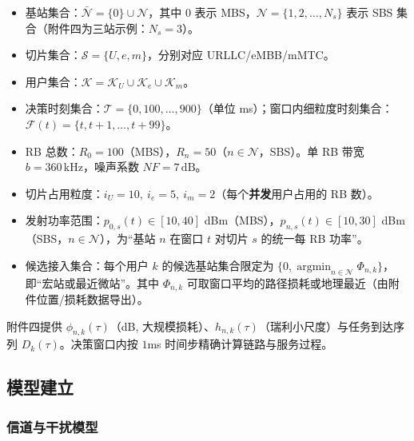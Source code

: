 \begin{itemize}
  \item 基站集合：$\bar{\mathcal{N}}=\{0\}\cup\mathcal{N}$，其中 $0$ 表示 MBS，$\mathcal{N}=\{1,2,\dots,N_s\}$ 表示 SBS 集合（附件四为三站示例：$N_s=3$）。
  \item 切片集合：$\mathcal{S}=\{U,e,m\}$，分别对应 URLLC/eMBB/mMTC。
  \item 用户集合：$\mathcal{K}=\mathcal{K}_U\cup\mathcal{K}_e\cup\mathcal{K}_m$。
  \item 决策时刻集合：$\mathcal{T}=\{0,100,\dots,900\}$（单位 ms）；窗口内细粒度时刻集合：$\mathcal{F}(t)=\{t,t+1,\dots,t+99\}$。
  \item RB 总数：$R_0=100$（MBS），$R_n=50$（$n\in\mathcal{N}$，SBS）。单 RB 带宽 $b=360\,\mathrm{kHz}$，噪声系数 $NF=7\,\mathrm{dB}$。
  \item 切片占用粒度：$i_U=10,\ i_e=5,\ i_m=2$（每个\textbf{并发}用户占用的 RB 数）。
  \item 发射功率范围：$p_{0,s}(t)\in[10,40]$ dBm（MBS），$p_{n,s}(t)\in[10,30]$ dBm（SBS，$n\in\mathcal{N}$），为“基站 $n$ 在窗口 $t$ 对切片 $s$ 的统一每 RB 功率”。
  \item 候选接入集合：每个用户 $k$ 的候选基站集合限定为 $\{0,\operatorname*{argmin}_{n\in\mathcal{N}}\Phi_{n,k}\}$，即“宏站或最近微站”。其中 $\Phi_{n,k}$ 可取窗口平均的路径损耗或地理最近（由附件位置/损耗数据导出）。
\end{itemize}

附件四提供 $\phi_{n,k}(\tau)$（dB, 大规模损耗）、$h_{n,k}(\tau)$（瑞利小尺度）与任务到达序列 $D_k(\tau)$。决策窗口内按 $1$ms 时间步精确计算链路与服务过程。

\subsection{模型建立}

\subsubsection{信道与干扰模型}


